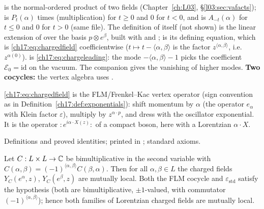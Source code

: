 \begin{dictionary}
 is the normal-ordered product of two fields (Chapter~\ref{ch:L03}, \S\ref{l03:sec:vafacts});
 is $P_t(\alpha)$ times (multiplication) for $t\ge0$ and $0$ for $t<0$, and
 is $A_{-t}(\alpha)$ for $t\le0$ and $0$ for $t>0$ (same file).  The definition of
 itself (not shown) is the linear extension of  over the basis
$p\otimes e^\beta$, built with  and ;  is
its defining equation, which is \eqref{ch17:eq:chargedfield} coefficientwise ($t\mapsto t-\langle\alpha,\beta\rangle$ is
the factor $z^{\langle\alpha,\beta\rangle}$, i.e.\ $z^{\alpha(0)}$).   is
\eqref{ch17:eq:chargeleading}: the mode $-\langle\alpha,\beta\rangle-1$ picks the coefficient $\mathcal E_0=\mathrm{id}$ on the
vacuum.  The companion  gives the vanishing of higher modes.
\textbf{Two cocycles:} the vertex algebra uses .
\end{dictionary}

\begin{physics}
\eqref{ch17:eq:chargedfield} is the FLM/Frenkel--Kac vertex operator (sign convention as in
Definition~\ref{ch17:def:exponentials}): shift momentum by $\alpha$ (the operator $e_\alpha$ with Klein
factor $\varepsilon$), multiply by $z^{\alpha\cdot p}$, and dress with the oscillator exponential.  It is the operator
${:}e^{i\alpha\cdot X(z)}{:}$ of a compact boson, here with a Lorentzian $\alpha\cdot X$.
\end{physics}

\begin{status}
Definitions and proved identities; printed in ; standard axioms.
\end{status}

\begin{theorem}\label{ch17:thm:chargedlocal}
Let $C:L\times L\to{\mathbb{C}}$ be bimultiplicative in the second variable with $C(\alpha,\beta)=(-1)^{\langle\alpha,\beta\rangle}C(\beta,\alpha)$.
Then for all $\alpha,\beta\in L$ the charged fields $Y_C(e^\alpha,z)$, $Y_C(e^\beta,z)$ are mutually local.  Both the
FLM cocycle and $\varepsilon_{\mathrm{std}}$ satisfy the hypothesis (both are bimultiplicative, $\pm1$-valued, with
commutator $(-1)^{\langle\alpha,\beta\rangle}$); hence both families of Lorentzian charged
fields are mutually local.
\end{theorem}

